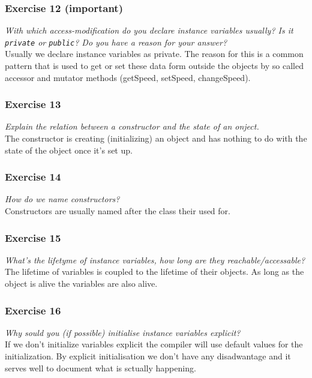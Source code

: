 \subsubsection*{Exercise 12 (important)}
\textit{With which access-modification do you declare instance variables
	usually? Is it \lstinline{private} or \lstinline{public}? Do you
	have a reason for your answer?}\\

Usually we declare instance variables as private. The reason for this is a 
common pattern that is used to get or set these data form outside the objects
by so called accessor and mutator methods (getSpeed, setSpeed, changeSpeed).

\subsubsection*{Exercise 13}
\textit{Explain the relation between a constructor and the state of an 
	onject.}\\

	The constructor is creating (initializing) an object and has nothing
	to do with the state of the object once it's set up.

\subsubsection*{Exercise 14}
\textit{How do we name constructors?}\\

Constructors are usually named after the class their used for.

\subsubsection*{Exercise 15}
\textit{What's the lifetyme of instance variables, how long are they
	reachable/accessable?}\\

The lifetime of variables is coupled to the lifetime of their objects.
As long as the object is alive the variables are also alive.

\subsubsection*{Exercise 16}
\textit{Why sould you (if possible) initialise instance variables explicit?}\\

If we don't initialize variables explicit the compiler will use default values
for the initialization. By explicit initialisation we don't have any 
disadwantage and it serves well to document what is sctually happening.

